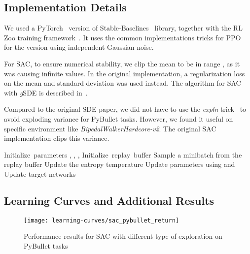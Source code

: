 \documentclass{article}
\newcommand{\SDE}{\textsc{SDE}\xspace}
\newcommand{\ourSDE}{\textit{g}\textsc{SDE}\xspace}
\newcommand{\ppo}{\textsc{PPO}\xspace}
\newcommand{\sac}{\textsc{SAC}\xspace}
\begin{document}
\subsection{Implementation Details}
\label{sec:implementation}

We used a PyTorch~\citep{raffin2019baselines3} version of Stable-Baselines~\citep{hill2018stable} library, together with the RL Zoo training framework~\citep{raffin2020zoo3}.
It uses the common implementations tricks for \ppo~\citep{engstrom2020implementation} for the version using independent Gaussian noise.

For \sac, to ensure numerical stability, we clip the mean to be in range , as it was causing infinite values. In the original implementation, a regularization  loss on the mean and standard deviation was used instead. The algorithm for \sac with \ourSDE is described in~.

Compared to the original \SDE paper, we did not have to use the \textit{expln} trick~\citep{ruckstiess2008state} to avoid exploding variance for PyBullet tasks. However, we found it useful on specific environment like \textit{BipedalWalkerHardcore-v2}. The original \sac implementation clips this variance.


\begin{algorithm}[h]
\caption{Soft Actor-Critic with \ourSDE}
\label{algo:sac-sde}
\begin{algorithmic}
\State \mbox{Initialize parameters} , , , 
\State \mbox{Initialize replay buffer} 
  \State  {}
  	\State   {}
  	\State  {}
  	\State 
	\EndFor
    \State  {}
    \State Sample a minibatch from the replay buffer 
    \State Update the entropy temperature 
    \State Update parameters using  and 
    \State Update target networks
	\EndFor
\EndFor
\end{algorithmic}
\end{algorithm}


\subsection{Learning Curves and Additional Results}
\label{sec:learning-curves}

\begin{figure}[h!]
  \centering\texttt{[image: learning-curves/sac\_pybullet\_return]}
  \label{fig:sac-pybullet-return}
  \caption{Performance results for SAC with different type of exploration on PyBullet tasks}
\end{figure}
\end{document}
